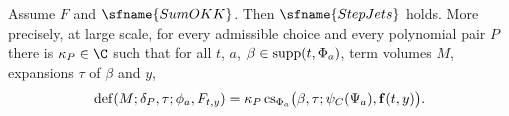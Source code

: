 \begin{proposition}[Jets]\label{pf:rowprops:jetsmain}
Assume $F$ and $\sfname{SumOKK}$. Then $\sfname{StepJets}$ holds. More precisely, at large scale, for every admissible
choice and every polynomial pair $P$ there is $\kappa_P\in\C$ such that for all $t$, $a$, $\beta\in\mathrm{supp}(t,\Phi_a)$,
term volumes $M$, expansions $\tau$ of $\beta$ and $y$,
\begin{equation}\label{eq:pf:rowprops:jetsone}
\mathrm{def}(M;\delta_P,\tau;\phi_a,F_{t,y})=\kappa_P\,\mathrm{cs}_{\Phi_a}\bigl(\beta,\tau;\psi_C(\Psi_a),\mathbf{f}(t,y)\bigr).
\end{equation}
\end{proposition}


